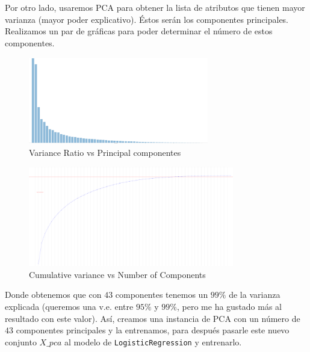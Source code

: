 \documentclass[letterpaper,11pt]{article}
\begin{document}
\begin{enumerate}
    Por otro lado, usaremos PCA para obtener la lista de atributos que tienen 
    mayor varianza (mayor poder explicativo). Éstos serán los componentes 
    principales. Realizamos un par de gráficas para poder determinar el 
    número de estos componentes.
    \begin{figure}[ht]
        \centering
        \includegraphics[width=0.7\textwidth]{imagenes/sonar-pca1.png}
        \caption{Variance Ratio vs Principal componentes }
    \end{figure}
    \begin{figure}[ht]
        \centering
        \includegraphics[width=0.8\textwidth]{imagenes/sonar-pca2.png}
        \caption{Cumulative variance vs Number of Components}
    \end{figure}


    Donde obtenemos que con $43$ componentes tenemos un $99\%$ de la 
    varianza explicada (queremos una v.e. entre $95\%$ y $99\%$, pero me ha 
    gustado más al resultado con este valor). Así, creamos una instancia 
    de PCA con un número de $43$ componentes principales y la entrenamos, 
    para después pasarle este nuevo conjunto $X\_pca$ al modelo de 
    \texttt{LogisticRegression} y entrenarlo.


\end{enumerate}
\end{document}
